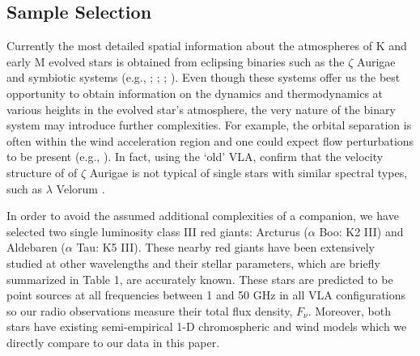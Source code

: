 \documentclass[iop]{emulateapj}
\begin{document}
\subsection{Sample Selection} \label{intro2}

Currently the most detailed spatial information about the atmospheres of K and early M evolved stars is obtained from eclipsing binaries such as the $\zeta$ Aurigae and symbiotic systems (e.g., \citealt{1970VA.....12..147W}; \citealt{1996ApJ...466..979B}; \citealt{2008AJ....136.1964E}; \citealt{2008ApJ...675..711C}). Even though these systems offer us the best opportunity to obtain information on the dynamics and thermodynamics at various heights in the evolved star's atmosphere, the very nature of the binary system may introduce further complexities. For example, the orbital separation is often within the wind acceleration region and one could expect flow perturbations to be present (e.g., \citealt{1981ApJ...248.1043C}). In fact, using the `old' VLA, \cite{2005AJ....129.1018H} confirm that the velocity structure of  of $\zeta$ Aurigae is not typical of single stars with similar spectral types, such as $\lambda$ Velorum \citep{1999ApJ...521..382C}. 

In order to avoid the assumed additional complexities of a companion, we have selected two single luminosity class III red giants: Arcturus ($\alpha$ Boo: K2 III) and Aldebaren ($\alpha$ Tau: K5 III). These nearby red giants have been extensively studied at other wavelengths and their stellar parameters, which are briefly summarized in Table 1, are accurately known. These stars are predicted to be point sources at all frequencies between 1 and 50 GHz in all VLA configurations so our radio observations measure their total flux density, $F_{\nu}$. Moreover, both stars have existing semi-empirical 1-D chromospheric and wind models which we directly compare to our data in this paper. 
\end{document}

